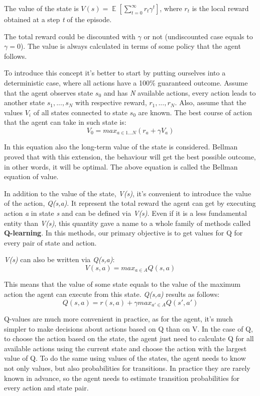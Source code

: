 \documentclass[12pt]{article}
\DeclareMathOperator{\EX}{\mathbb{E}}%
\begin{document}
The value of the state is $V(s)=\EX[\sum^\infty_{t=0} r_t\gamma^t]$, where $r_t$ is the local reward obtained at a step \textit{t} of the episode.

The total reward could be discounted with $\gamma$ or not (undiscounted case equals to $\gamma=0$). The value is always calculated in terms of some policy that the agent follows.

To introduce this concept it's better to start by putting ourselves into a deterministic case, where all actions have a 100\% guaranteed outcome. Assume that the agent observes state $s_0$ and has \textit{N} available actions, every action leads to another state $s_1,...,s_N$ with respective reward, $r_1,...,r_N$. Also, assume that the values $V_i$ of all states connected to state $s_0$ are known. The best course of action that the agent can take in such state is:
\[ V_0 = max_{a \in 1...N} (r_a+ \gamma V_a)\]

In this equation also the long-term value of the state is considered. Bellman proved that with this extension, the behaviour will get the best possible outcome, in other words, it will be optimal. The above equation is called the Bellman equation of value. 

In addition to the value of the state, \textit{V(s)}, it's convenient to introduce the value of the action, \textit{Q(s,a)}. It represent the total reward the agent can get by executing action \textit{a} in state \textit{s} and can be defined via \textit{V(s)}. Even if it is a less fundamental entity than \textit{V(s)}, this quantity gave a name to a whole family of methods called \textbf{Q-learning}. In this methods, our primary objective is to get values for Q for every pair of state and action.

\textit{V(s)} can also be  written via \textit{Q(s,a)}:
\[V(s,a)= max_{a\in A}Q(s,a)\]

This means that the value of some state equals to the value of the maximum action the agent can execute from this state. \textit{Q(s,a)} results as follows:
\[Q(s,a) = r(s,a) + \gamma max_{a' \in A} Q(s',a')\]

Q-values are much more convenient in practice, as for the agent, it's much simpler to make decisions about actions based on Q than on V. In the case of Q, to choose the action based on the state, the agent just need to calculate Q for all available actions using the current state and choose the action with the largest value of Q. To do the same using values of the states, the agent needs to know not only values, but also probabilities for transitions. In practice they are rarely known in advance, so the agent needs to estimate transition probabilities for every action and state pair.
\end{document}
